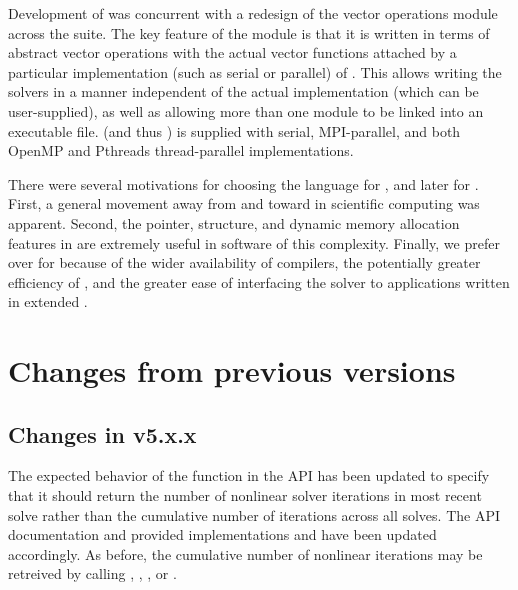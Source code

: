 Development of {\cvodes} was concurrent with a redesign of the vector
operations module across the {\sundials} suite. The key feature of the
{\nvector} module is that it is written in terms of abstract
vector operations with the actual vector functions attached by a
particular implementation (such as serial or parallel) of
{\nvector}. This allows writing the {\sundials} solvers in a manner
independent of the actual {\nvector} implementation (which can be
user-supplied), as well as allowing more than one {\nvector} module to
be linked into an executable file.
{\sundials} (and thus {\cvodes}) is supplied with serial,
MPI-parallel, and both OpenMP and Pthreads thread-parallel
{\nvector} implementations.

 There were
several motivations for choosing the {\CC} language for {\cvode}, and
later for {\cvodes}.  First, a general movement away from {\F} and
toward {\CC} in scientific computing was apparent.
Second, the pointer, structure, and dynamic memory allocation features
in {\CC} are extremely useful in software of this complexity.  Finally,
we prefer {\CC} over {\CPP} for {\cvodes} because of the wider
availability of {\CC} compilers, the potentially greater efficiency of
{\CC}, and the greater ease of interfacing the solver to applications
written in extended {\F}.  

\section{Changes from previous versions}

\subsection*{Changes in v5.x.x}

The expected behavior of the  function in the
{\sunnonlinsol} API has been updated to specify that it should return the
number of nonlinear solver iterations in most recent solve rather than the
cumulative number of iterations across all solves. The API documentation and
{\sundials} provided {\sunnonlinsol} implementations and have been updated
accordingly. As before, the cumulative number of nonlinear iterations may be
retreived by calling , ,
, or .

